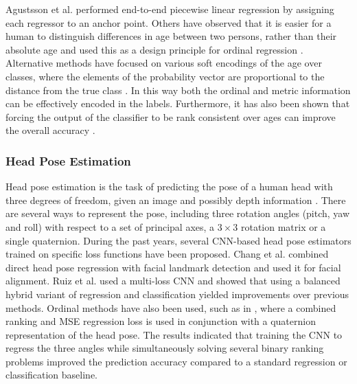 \documentclass[10pt, conference, a4paper]{IEEEtran}
\begin{document}
Agustsson et al. \cite{agustsson2017anchored} performed end-to-end piecewise linear regression by assigning each regressor to an anchor point. Others have observed that it is easier for a human to distinguish differences in age between two persons, rather than their absolute age and used this as a design principle for ordinal regression \cite{zhang2017quantifying, niu2016ordinal}. Alternative methods have focused on various soft encodings of the age over classes, where the elements of the probability vector are proportional to the distance from the true class \cite{gao2017deep, zeng2019soft, diaz2019soft}. In this way both the ordinal and metric information can be effectively encoded in the labels. Furthermore, it has also been shown that forcing the output of the classifier to be rank consistent over ages can improve the overall accuracy \cite{beckham2017unimodal, cao2019rank}.

\subsubsection{Head Pose Estimation}
Head pose estimation is the task of predicting the pose of a human head with three degrees of freedom, given an image and possibly depth information \cite{murphy2008head}. There are several ways to represent the pose, including three rotation angles (pitch, yaw and roll) with respect to a set of principal axes, a $3\times 3$ rotation matrix or a single quaternion. During the past years, several CNN-based head pose estimators trained on specific loss functions have been proposed. Chang et al. \cite{chang2017faceposenet} combined direct head pose regression with facial landmark detection and used it for facial alignment. Ruiz et al. \cite{ruiz2018fine} used a multi-loss CNN and showed that using a balanced hybrid variant of regression and classification yielded improvements over previous methods. Ordinal methods have also been used, such as in \cite{hsu2018quatnet}, where a combined ranking and MSE regression loss is used in conjunction with a quaternion representation of the head pose. The results indicated that training the CNN to regress the three angles while simultaneously solving several binary ranking problems improved the prediction accuracy compared to a standard regression or classification baseline. 
\end{document}
